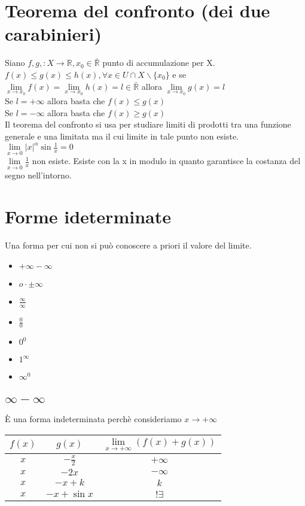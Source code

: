 \section{Teorema del confronto (dei due carabinieri)}
Siano $f,g,: X\rightarrow\mathbb{R}, x_0\in\bar{\mathbb{R}}$ punto di accumulazione per X.\\
$f(x)\le g(x)\le h(x), \forall x\in U\cap X\backslash\{x_0\}$ e se $\lim\limits_{x \rightarrow x_0} f(x)=\lim\limits_{x \rightarrow x_0} h(x)=l\in\bar{\mathbb{R}}$ allora $\lim\limits_{x \rightarrow x_0} g(x)=l$\\
Se $l=+\infty$ allora basta che $f(x)\le g(x)$\\
Se $l=-\infty$ allora basta che $f(x)\ge g(x)$\\
Il teorema del confronto si usa per studiare limiti di prodotti tra una funzione generale e una limitata ma il cui limite in tale punto non esiste.\\
$\lim\limits_{x\rightarrow 0} |x|^\alpha \sin\frac{1}{x}=0$\\
$\lim\limits_{x\rightarrow 0}\frac{1}{x}$ non esiste. Esiste con la x in modulo in quanto garantisce la costanza del segno nell'intorno.
\section{Forme ideterminate}
Una forma per cui non si pu\`o conoscere a priori il valore del limite.
\begin{itemize}
\item $+\infty-\infty$
\item $o\cdot\pm\infty$
\item $\frac{\infty}{\infty}$
\item $\frac{0}{0}$
\item $0^0$
\item $1^{\infty}$
\item $\infty^0$
\end{itemize}
\subsection{$\infty-\infty$}
\`E una forma indeterminata perch\`e consideriamo $x\rightarrow +\infty$
\\
\begin{tabular}{|c|c|c|}
\hline
$f(x)$ & $g(x)$ & $\lim\limits_{x\rightarrow +\infty} (f(x)+g(x))$\\
\hline
$x$ & $-\frac{x}{2}$ & $+\infty$\\
\hline
$x$ & $-2x$ & $-\infty$\\
\hline
$x$ & $-x+k$ & $k$\\
\hline
$x$ & $-x+\sin x$& $!\exists$\\ 
\hline
\end{tabular}
